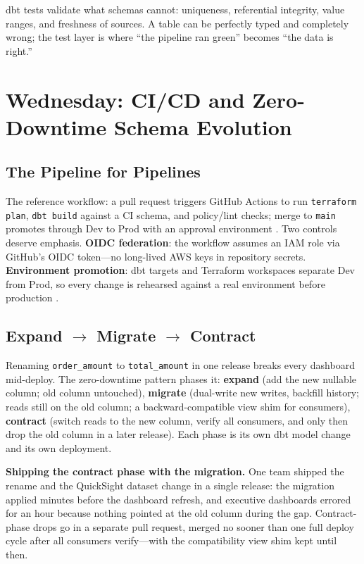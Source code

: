 \begin{tipbox}
dbt tests validate what schemas cannot: uniqueness, referential integrity, value ranges, and freshness of sources. A table can be perfectly typed and completely wrong; the test layer is where ``the pipeline ran green'' becomes ``the data is right.''
\end{tipbox}

\section{Wednesday: CI/CD and Zero-Downtime Schema Evolution}
\subsection{The Pipeline for Pipelines}
The reference workflow: a pull request triggers GitHub Actions to run \texttt{terraform plan}, \texttt{dbt build} against a CI schema, and policy/lint checks; merge to \texttt{main} promotes through Dev to Prod with an approval environment \cite{githubActionsDocs}. Two controls deserve emphasis. \textbf{OIDC federation}: the workflow assumes an IAM role via GitHub's OIDC token---no long-lived AWS keys in repository secrets. \textbf{Environment promotion}: dbt targets and Terraform workspaces separate Dev from Prod, so every change is rehearsed against a real environment before production \cite{awsIAMDocs}.

\subsection{Expand $\rightarrow$ Migrate $\rightarrow$ Contract}
Renaming \texttt{order\_amount} to \texttt{total\_amount} in one release breaks every dashboard mid-deploy. The zero-downtime pattern phases it: \textbf{expand} (add the new nullable column; old column untouched), \textbf{migrate} (dual-write new writes, backfill history; reads still on the old column; a backward-compatible view shim for consumers), \textbf{contract} (switch reads to the new column, verify all consumers, and only then drop the old column in a later release). Each phase is its own dbt model change and its own deployment.

\begin{pitfall}
\textbf{Shipping the contract phase with the migration.} One team shipped the rename and the QuickSight dataset change in a single release: the migration applied minutes before the dashboard refresh, and executive dashboards errored for an hour because nothing pointed at the old column during the gap. Contract-phase drops go in a separate pull request, merged no sooner than one full deploy cycle after all consumers verify---with the compatibility view shim kept until then.
\end{pitfall}

